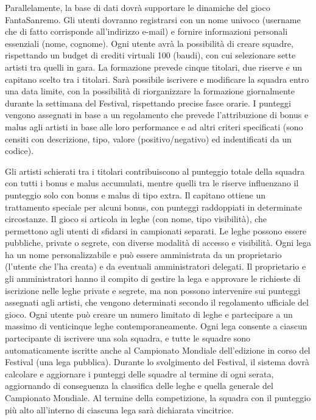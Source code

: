 \documentclass[a4paper,12pt]{article}
\begin{document}
Parallelamente, la base di dati dovrà supportare le dinamiche del gioco FantaSanremo. Gli utenti dovranno registrarsi con un nome univoco (username che di fatto corrisponde all'indirizzo e-mail) e fornire informazioni personali essenziali (nome, cognome). Ogni utente avrà la possibilità di creare squadre, rispettando un budget di crediti virtuali 100 (baudi), con cui selezionare sette artisti tra quelli in gara. La formazione prevede cinque titolari, due riserve e un capitano scelto tra i titolari. Sarà possibile iscrivere e modificare la squadra entro una data limite, con la possibilità di riorganizzare la formazione giornalmente durante la settimana del Festival, rispettando precise fasce orarie. I punteggi vengono assegnati in base a un regolamento che prevede l’attribuzione di bonus e malus agli artisti in base alle loro performance e ad altri criteri specificati (sono censiti con descrizione, tipo, valore (positivo/negativo) ed  indentificati da un codice).

Gli artisti schierati tra i titolari contribuiscono al punteggio totale della squadra con tutti i bonus e malus accumulati, mentre quelli tra le riserve influenzano il punteggio solo con bonus e malus di tipo extra. Il capitano ottiene un trattamento speciale per alcuni bonus, con punteggi raddoppiati in determinate circostanze. Il gioco si articola in leghe (con nome, tipo visibilità), che permettono agli utenti di sfidarsi in campionati separati. Le leghe possono essere pubbliche, private o segrete, con diverse modalità di accesso e visibilità. Ogni lega ha un nome personalizzabile e può essere amministrata da un proprietario (l’utente che l’ha creata) e da eventuali amministratori delegati.
Il proprietario e gli amministratori hanno il compito di gestire la lega e approvare le richieste di iscrizione nelle leghe private e segrete, ma non possono intervenire sui punteggi assegnati agli artisti, che vengono determinati secondo il regolamento ufficiale del gioco. Ogni utente può creare un numero limitato di leghe e partecipare a un massimo di venticinque leghe contemporaneamente. Ogni lega consente a ciascun partecipante di iscrivere una sola squadra, e tutte le squadre sono automaticamente iscritte anche al Campionato Mondiale dell’edizione in corso del Festival (una lega pubblica). Durante lo svolgimento del Festival, il sistema dovrà calcolare e aggiornare i punteggi delle squadre al termine di ogni serata, aggiornando di conseguenza la classifica delle leghe e quella generale del Campionato Mondiale. Al termine della competizione, la squadra con il punteggio più alto all’interno di ciascuna lega sarà dichiarata vincitrice.
\end{document}
